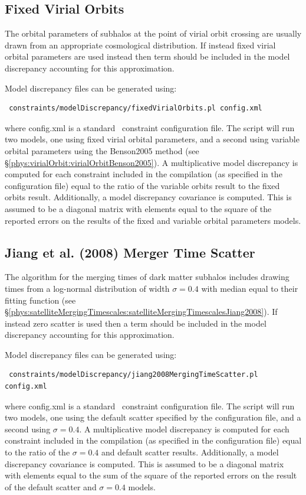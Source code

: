 \subsection{Fixed Virial Orbits}

The orbital parameters of subhalos at the point of virial orbit crossing are usually drawn from an appropriate cosmological distribution. If instead fixed virial orbital parameters are used instead then term should be included in the model discrepancy accounting for this approximation. 

Model discrepancy files can be generated using:
\begin{verbatim}
 constraints/modelDiscrepancy/fixedVirialOrbits.pl config.xml
\end{verbatim}
where {\normalfont \ttfamily config.xml} is a standard \glc\ constraint configuration file. The script will run two models, one using fixed virial orbital parameters, and a second using variable orbital parameters using the {\normalfont \ttfamily Benson2005} method (see \S\ref{phys:virialOrbit:virialOrbitBenson2005}). A multiplicative model discrepancy is computed for each constraint included in the compilation (as specified in the configuration file) equal to the ratio of the variable orbits result to the fixed orbits result. Additionally, a model discrepancy covariance is computed. This is assumed to be a diagonal matrix with elements equal to the square of the reported errors on the results of the fixed and variable orbital parameters models.

\subsection{Jiang et al. (2008) Merger Time Scatter}

The \cite{jiang_fitting_2008} algorithm for the merging times of dark matter subhalos includes drawing times from a log-normal distribution of width $\sigma=0.4$ with median equal to their fitting function (see \S\ref{phys:satelliteMergingTimescales:satelliteMergingTimescalesJiang2008}). If instead zero scatter is used then a term should be included in the model discrepancy accounting for this approximation. 

Model discrepancy files can be generated using:
\begin{verbatim}
 constraints/modelDiscrepancy/jiang2008MergingTimeScatter.pl config.xml
\end{verbatim}
where {\normalfont \ttfamily config.xml} is a standard \glc\ constraint configuration file. The script will run two models, one using the default scatter specified by the configuration file, and a second using $\sigma=0.4$. A multiplicative model discrepancy is computed for each constraint included in the compilation (as specified in the configuration file) equal to the ratio of the $\sigma=0.4$ and default scatter results. Additionally, a model discrepancy covariance is computed. This is assumed to be a diagonal matrix with elements equal to the sum of the square of the reported errors on the result of the default scatter and $\sigma=0.4$ models.

